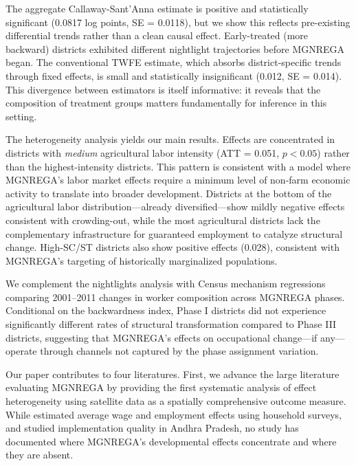 \documentclass[12pt]{article}
\begin{document}
The aggregate Callaway-Sant'Anna estimate is positive and statistically significant (0.0817 log points, SE = 0.0118), but we show this reflects pre-existing differential trends rather than a clean causal effect. Early-treated (more backward) districts exhibited different nightlight trajectories before MGNREGA began. The conventional TWFE estimate, which absorbs district-specific trends through fixed effects, is small and statistically insignificant (0.012, SE = 0.014). This divergence between estimators is itself informative: it reveals that the composition of treatment groups matters fundamentally for inference in this setting.

The heterogeneity analysis yields our main results. Effects are concentrated in districts with \textit{medium} agricultural labor intensity (ATT = 0.051, $p < 0.05$) rather than the highest-intensity districts. This pattern is consistent with a model where MGNREGA's labor market effects require a minimum level of non-farm economic activity to translate into broader development. Districts at the bottom of the agricultural labor distribution---already diversified---show mildly negative effects consistent with crowding-out, while the most agricultural districts lack the complementary infrastructure for guaranteed employment to catalyze structural change. High-SC/ST districts also show positive effects (0.028), consistent with MGNREGA's targeting of historically marginalized populations.

We complement the nightlights analysis with Census mechanism regressions comparing 2001--2011 changes in worker composition across MGNREGA phases. Conditional on the backwardness index, Phase I districts did not experience significantly different rates of structural transformation compared to Phase III districts, suggesting that MGNREGA's effects on occupational change---if any---operate through channels not captured by the phase assignment variation.

Our paper contributes to four literatures. First, we advance the large literature evaluating MGNREGA \citep{zimmermann2012employment, azam2012impact, klonner2016private, berg2018can, sukhtankar2017sweetening} by providing the first systematic analysis of effect heterogeneity using satellite data as a spatially comprehensive outcome measure. While \citet{imbert2015labor} estimated average wage and employment effects using household surveys, and \citet{muralidharan2016building} studied implementation quality in Andhra Pradesh, no study has documented where MGNREGA's developmental effects concentrate and where they are absent.
\end{document}
